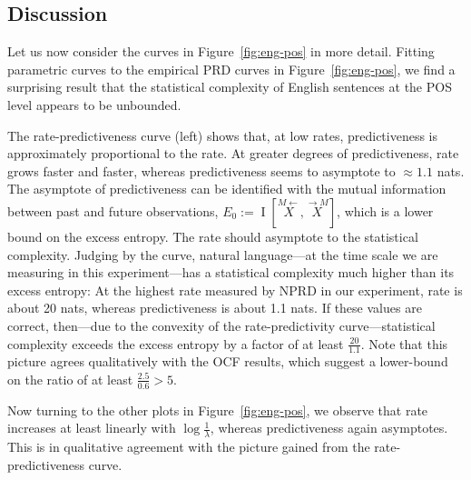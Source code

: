 \documentclass[entropy,article,submit,moreauthors,pdftex,10pt,a4paper]{Definitions/mdpi}
\newcommand{\finitefuture}{\stackrel{\rightarrow \scriptscriptstyle{M}}{X}}
\newcommand{\finitepast}{\stackrel{\scriptscriptstyle{M}\leftarrow}{X}}%
\begin{document}
\subsection{Discussion}
Let us now consider the curves in Figure~\ref{fig:eng-pos} in more detail.
Fitting parametric curves to the empirical PRD curves in Figure~\ref{fig:eng-pos}, we find a surprising result that the statistical complexity of English sentences at the POS level appears to be unbounded.

The rate-predictiveness curve (left) shows that, at low rates, predictiveness is approximately proportional to the rate.
At greater degrees of predictiveness, rate grows faster and faster, whereas predictiveness seems to asymptote to $\approx 1.1$ nats.
The asymptote of predictiveness can be identified with the mutual information between past and future observations, $E_0 := \operatorname{I}[\finitepast, \finitefuture]$, which is a lower bound on the excess entropy. The rate should asymptote to the statistical complexity.
Judging by the curve, natural language---at the time scale we are measuring in this experiment---has a statistical complexity much higher than its excess entropy:
At the highest rate measured by NPRD in our experiment, rate is about 20 nats, whereas predictiveness is about 1.1 nats.
If these values are correct, then---due to the convexity of the rate-predictivity curve---statistical complexity exceeds the excess entropy by a factor of at least $\frac{20}{1.1}$. 
Note that this picture agrees qualitatively with the OCF results, which suggest a lower-bound on the ratio of at least $\frac{2.5}{0.6} > 5$.

Now turning to the other plots in Figure~\ref{fig:eng-pos}, we observe that rate increases at least linearly with $\log\frac{1}{\lambda}$, whereas predictiveness again asymptotes.
This is in qualitative agreement with the picture gained from the rate-predictiveness curve.
\end{document}
